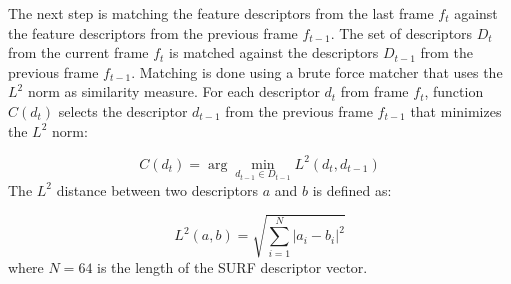 The next step is matching the feature descriptors from the last frame $f_t$ against the feature descriptors from the previous frame $f_{t-1}$.
The set of descriptors $D_{t}$ from the current frame $f_t$ is matched against the descriptors $D_{t-1}$ from the previous frame $f_{t-1}$.
Matching is done using a brute force matcher that uses the $L^2$ norm as similarity measure.
For each descriptor $d_{t}$ from frame $f_t$, function $C(d_{t})$ selects the descriptor $d_{t-1}$ from the previous frame $f_{t-1}$ that minimizes the $L^2$ norm:

\begin{equation}
C(d_{t}) = \arg\min_{d_{t-1} \in D_{t-1}} L^2(d_t, d_{t-1})
\end{equation}
The $L^2$ distance between two descriptors $a$ and $b$ is defined as:

\begin{equation}
L^2(a,b) =\sqrt { \sum_{i=1}^{N} \left| a_i - b_i \right| ^2 }
\end{equation}
where $N = 64$ is the length of the SURF descriptor vector.

